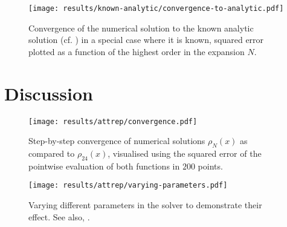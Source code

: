 \begin{figure}[H]
  \centering
  \texttt{[image: results/known-analytic/convergence-to-analytic.pdf]}
  \caption[Convergence to analytic solution]{Convergence of the numerical solution to the known analytic solution (cf. ) in a special case where it is known, squared error plotted as a function of the highest order in the expansion $N$.}
  \label{fig:convergence-to-analytic}
\end{figure}

\section{Discussion}
\begin{figure}[H]
  \centering
  \texttt{[image: results/attrep/convergence.pdf]}
  \caption[Step-by-step convergence of solutions compared to order 24]{Step-by-step convergence of numerical solutions $\rho_N(x)$ as compared to $\rho_{24}(x)$, visualised using the squared error of the pointwise evaluation of both functions in $200$ points.}
  \label{fig:convergence}
\end{figure}

\begin{figure}[H]
  \centering
  \texttt{[image: results/attrep/varying-parameters.pdf]}
  \caption[Varying parameters in the solver]{
    Varying different parameters in the solver to demonstrate their effect.
    See also, .
  }
  \label{fig:varying-parameters}
\end{figure}
